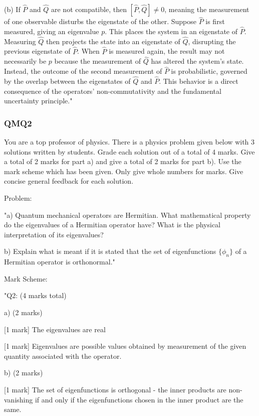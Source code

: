 (b) If $\hat{P}$ and $\hat{Q}$ are not compatible, then $[\hat{P}, \hat{Q}] \neq 0$, meaning the measurement of one observable disturbs the eigenstate of the other. Suppose $\hat{P}$ is first measured, giving an eigenvalue $p$. This places the system in an eigenstate of $\hat{P}$. Measuring $\hat{Q}$ then projects the state into an eigenstate of $\hat{Q}$, disrupting the previous eigenstate of $\hat{P}$. When $\hat{P}$ is measured again, the result may not necessarily be $p$ because the measurement of $\hat{Q}$ has altered the system's state. Instead, the outcome of the second measurement of $\hat{P}$ is probabilistic, governed by the overlap between the eigenstates of $\hat{Q}$ and $\hat{P}$. This behavior is a direct consequence of the operators' non-commutativity and the fundamental uncertainty principle."

\subsubsection{QMQ2}

You are a top professor of physics. There is a physics problem given below with 3 solutions written by students. Grade each solution out of a total of 4 marks. Give a total of 2 marks for part a) and give a total of 2 marks for part b). Use the mark scheme which has been given. Only give whole numbers for marks. Give concise general feedback for each solution. 

Problem: 

"a) Quantum mechanical operators are Hermitian. What mathematical property do the eigenvalues of a Hermitian operator have? What is the physical interpretation of its eigenvalues?

b) Explain what is meant if it is stated that the set of eigenfunctions \( \{\phi_{n}\} \) of a Hermitian operator is orthonormal."

Mark Scheme:

"{Q2: (4 marks total)}

a) (2 marks)

[1 mark] The eigenvalues are real 

[1 mark] Eigenvalues are possible values obtained by measurement of the given quantity associated with the operator. 

b) (2 marks)

[1 mark] The set of eigenfunctions is orthogonal - the inner products are non-vanishing if and only if the eigenfunctions chosen in the inner product are the same. 

